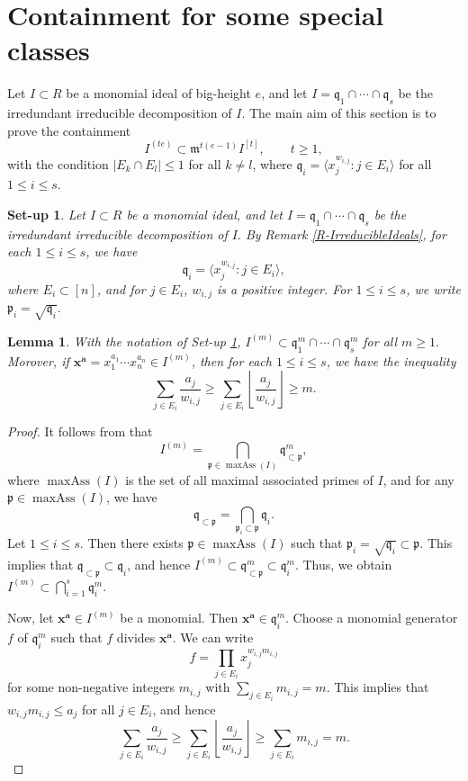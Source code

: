 \documentclass[12pt,reqno]{amsart}
\newtheorem{lemma}[thm]{Lemma}
\newtheorem{setup}[thm]{Set-up}
\theoremstyle{definition}
\DeclareMathOperator{\maxAss}{maxAss}
\newcommand{\mi}{\mathfrak{m}}
\newcommand{\p}{\mathfrak{p}}
\newcommand{\q}{\mathfrak{q}}
\newcommand{\x}{\mathbf{x}}
\newcommand{\ba}{\mathbf{a}}
\numberwithin{equation}{section}
\begin{document}
\section{Containment for some special classes}\label{S-ContainmentProblem}

Let $I \subset R$ be a monomial ideal of big-height $e$, and let $I = \q_1 \cap \cdots \cap \q_s$ be the irredundant irreducible decomposition of $I.$ The main aim of this section is to prove the containment 
\[I^{(te)} \subset \mi^{t(e - 1)} I^{[t]}, \qquad t \ge 1,\]
with the condition $|E_k \cap E_l| \le 1$ for all $k \ne l$, where $\q_i = \langle x_j^{w_{i, j}} : j \in E_i \rangle$ for all $1 \le i \le s.$

\begin{setup}\label{setup}
    Let $I \subset R$ be a monomial ideal, and let $I = \q_1 \cap \cdots \cap \q_s$ be the irredundant irreducible decomposition of $I.$ By Remark \ref{R-IrreducibleIdeals}, for each $1 \le i \le s$, we have 
    \[\q_i = \langle x_j^{w_{i, j}} : j \in E_i \rangle,\]
    where $E_i \subset [n]$, and for $j \in E_i$, $w_{i, j}$ is a positive integer. For $1 \le i \le s$, we write $\p_i = \sqrt{\q_i}.$
\end{setup}
    
\begin{lemma}\label{L-SymbolicPowerInequality}
    With the notation of Set-up \ref{setup}, $I^{(m)} \subset \q_1^m \cap \cdots \cap \q_s^m$ for all $m \ge 1.$ Morover, if $\x^{\ba} = x_1^{a_1} \cdots x_n^{a_n} \in I^{(m)}$, then for each $1 \le i \le s$, we have the inequality
    \[\sum_{j \in E_i} \dfrac{a_j}{w_{i,j}} \ge \sum_{j \in E_i} \left\lfloor \dfrac{a_j}{w_{i,j}} \right\rfloor \ge m.\]
\end{lemma}

\begin{proof}
    It follows from \cite[Theorem 3.7]{CEHH} that 
    \[I^{(m)} = \bigcap_{\p \in \maxAss(I)} \q_{\subset \p}^m,\]
    where $\maxAss(I)$ is the set of all maximal associated primes of $I$, and for any $\p \in \maxAss(I)$, we have 
    \[\q_{\subset \p} = \bigcap_{\p_i \subset \p} \q_i.\] 
    Let $1 \le i \le s.$ Then there exists $\p \in \maxAss(I)$ such that $\p_i = \sqrt{\q_i} \subset \p.$ This implies that $\q_{\subset \p} \subset \q_i$, and hence $I^{(m)} \subset \q_{\subset \p}^m \subset \q_i^m.$ Thus, we obtain $I^{(m)} \subset \bigcap_{i = 1}^{s} \q_i^m.$
    
    Now, let $\x^{\ba} \in I^{(m)}$ be a monomial. Then $\x^{\ba} \in \q_i^m.$ Choose a monomial generator $f$ of $\q_i^m$ such that $f$ divides $\x^{\ba}.$ We can write 
    \[f = \prod_{j \in E_i} x_j^{w_{i, j} m_{i, j}}\]
    for some non-negative integers $m_{i, j}$ with $\sum_{j \in E_i} m_{i, j} = m.$ This implies that $w_{i, j} m_{i, j} \le a_j$ for all $j \in E_i$, and hence
    \[\sum_{j \in E_i} \dfrac{a_j}{w_{i,j}} \ge \sum_{j \in E_i} \left\lfloor \dfrac{a_j}{w_{i,j}} \right\rfloor \ge \sum_{j \in E_i} m_{i, j} = m.\]
\end{proof}
\end{document}
